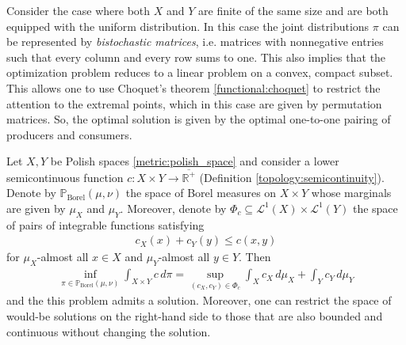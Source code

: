 
    \begin{example}
        Consider the case where both $X$ and $Y$ are finite of the same size and are both equipped with the uniform distribution. In this case the joint distributions $\pi$ can be represented by \textit{bistochastic matrices}, i.e. matrices with nonnegative entries such that every column and every row sums to one. This also implies that the optimization problem reduces to a linear problem on a convex, compact subset. This allows one to use Choquet's theorem \ref{functional:choquet} to restrict the attention to the extremal points, which in this case are given by permutation matrices. So, the optimal solution is given by the optimal one-to-one pairing of producers and consumers.
    \end{example}

    \begin{property}
        Let $X,Y$ be Polish spaces \ref{metric:polish_space} and consider a lower semicontinuous function $c:X\times Y\rightarrow\overline{\mathbb{R}^+}$ (Definition \ref{topology:semicontinuity}). Denote by $\mathbb{P}_\text{Borel}(\mu,\nu)$ the space of Borel measures on $X\times Y$ whose marginals are given by $\mu_X$ and $\mu_Y$. Moreover, denote by $\Phi_c\subseteq\mathcal{L}^1(X)\times\mathcal{L}^1(Y)$ the space of pairs of integrable functions satisfying
        \begin{gather}
            c_X(x)+c_Y(y)\leq c(x,y)
        \end{gather}
        for $\mu_X$-almost all $x\in X$ and $\mu_Y$-almost all $y\in Y$. Then
        \begin{gather}
            \inf_{\pi\in\mathbb{P}_\text{Borel}(\mu,\nu)}\int_{X\times Y}c\,d\pi = \sup_{(c_X,c_Y)\in\Phi_c}\int_Xc_X\,d\mu_X+\int_Yc_Y\,d\mu_Y
        \end{gather}
        and the this problem admits a solution. Moreover, one can restrict the space of would-be solutions on the right-hand side to those that are also bounded and continuous without changing the solution.
    \end{property}

